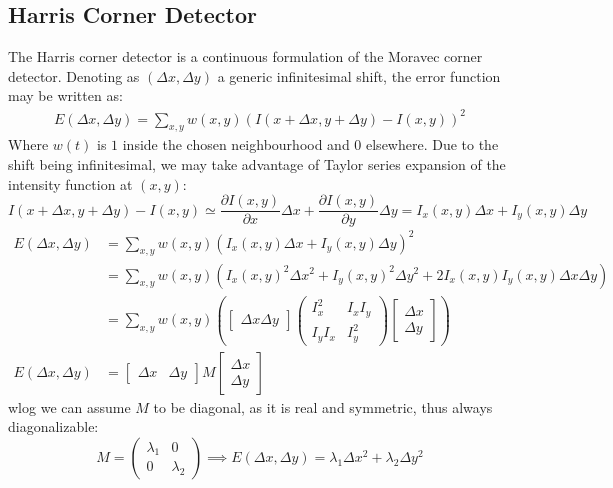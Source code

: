 \documentclass{article}
\begin{document}
\subsection{Harris Corner Detector}
The Harris corner detector is a continuous formulation of the Moravec corner detector. Denoting as $(\Delta x,\Delta y)$ a generic infinitesimal shift, the error function may be written as:
\begin{align*}
  E(\Delta x, \Delta y ) = \displaystyle\sum_{x,y}^{}w(x,y)(I(x+\Delta x, y + \Delta y)-I(x,y))^2
\end{align*}
Where $w(t)$ is $1$ inside the chosen neighbourhood and $0$ elsewhere.
Due to the shift being infinitesimal, we may take advantage of Taylor series expansion of the intensity function at $(x,y)$:
\[
  I(x+\Delta x, y+ \Delta y)-I(x,y) \simeq \displaystyle\frac{\partial I(x,y)}{\partial x}\Delta x + \displaystyle\frac{\partial I(x,y)}{\partial y}\Delta y = I_x(x,y)\Delta x + I_y (x,y) \Delta y
\]
\begin{align*}
    E(\Delta x, \Delta y ) &= \displaystyle\sum_{x,y}^{}w(x,y)(I_x(x,y)\Delta x + I_y(x,y)\Delta y )^2\\
    &=  \displaystyle\sum_{x,y}^{}w(x,y)(I_x(x,y)^2\Delta x^2 + I_y(x,y)^2\Delta y^2 + 2I_x(x,y)I_y(x,y)\Delta x \Delta y )\\
    &=\displaystyle\sum_{x,y}^{}w(x,y)\left( \begin{bmatrix}
      \Delta x \Delta y
      \end{bmatrix} \begin{pmatrix}
      I_x^2 & I_xI_y \\
      I_yI_x & I_y^2
      \end{pmatrix} \begin{bmatrix}
      \Delta x \\ \Delta y
  \end{bmatrix}\right) \\
    E(\Delta x, \Delta y) &= \begin{bmatrix}
    \Delta x & \Delta y
    \end{bmatrix} M \begin{bmatrix}
    \Delta x \\ \Delta y
  \end{bmatrix}
\end{align*}
wlog we can assume $M$ to be diagonal, as it is real and symmetric, thus always diagonalizable:
\[
  M=\begin{pmatrix}
    \lambda_1 & 0 \\ 0 & \lambda_2
  \end{pmatrix} \implies E(\Delta x, \Delta y) = \lambda_1 \Delta x^2 + \lambda_2 \Delta y^2
\]
\end{document}
